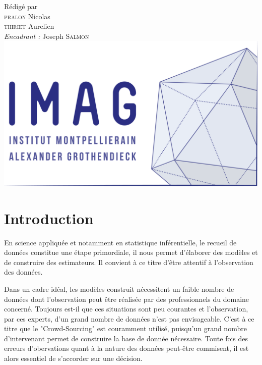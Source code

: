 \documentclass[frenchb]{report}
\newcommand{\1}{\mathbbm{1}}
\theoremstyle{definition}\newtheorem{defn}{Définition}
\theoremstyle{definition}\newtheorem{exm}{Exemple}
\theoremstyle{definition}\newtheorem{nota}{Notation}
\theoremstyle{definition}\newtheorem{rem}{Remarque}
\begin{document}
\begin{titlepage}
\begin{center}
{\large Rédigé par\\}
{\Large \textsc{pralon} Nicolas}\\
{\Large \textsc{thiriet} Aurelien}\\
{\large \emph{Encadrant :} Joseph \textsc{Salmon}}\\[1.5cm] 

\includegraphics[scale=0.7]{imag_logo.png}

\end{center}
\end{titlepage}
\tableofcontents
\newpage

\chapter*{Introduction}

En science appliquée et notamment en statistique inférentielle, le recueil de données constitue une étape primordiale, il nous permet d'élaborer des modèles et de construire des estimateurs. Il convient à ce titre d'être attentif à l'observation des données.

Dans un cadre idéal, les modèles construit nécessitent un faible nombre de données dont l'observation peut être réalisée par des professionnels du domaine concerné. Toujours est-il que ces situations sont peu courantes et l'observation, par ces experts, d'un grand nombre de données n'est pas envisageable. C'est à ce titre que le "Crowd-Sourcing" est couramment utilisé, puisqu'un grand nombre d'intervenant permet de construire la base de donnée nécessaire. Toute fois des erreurs d'obervations quant à la nature des données peut-être commisent, il est alors essentiel de s'accorder sur une décision.
\end{document}
